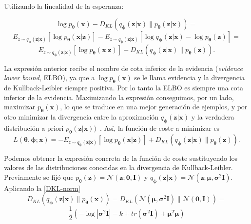 Utilizando la linealidad de la esperanza:

$$ \log p_{\boldsymbol{\theta}}(\textbf{x}) - D_{KL}(q_{\boldsymbol{\phi}}(\textbf{z}|\textbf{x}) \parallel p_{\boldsymbol{\theta}}(\textbf{z}|\textbf{x})) =$$ $$ E_{z \sim q_{\boldsymbol{\phi}} (\textbf{z}|\textbf{x})} \left[ \log p_{\boldsymbol{\theta}}(\textbf{x}|\textbf{z}) \right] - E_{z \sim q_{\boldsymbol{\phi}} (\textbf{z}|\textbf{x})} \left[ \log  q_{\boldsymbol{\phi}}(\textbf{z}|\textbf{x}) - \log p_{\boldsymbol{\theta}}(\textbf{z})\right]=$$ $$ E_{z \sim q_{\boldsymbol{\phi}} (\textbf{z}|\textbf{x})} \left[ \log p_{\boldsymbol{\theta}}(\textbf{x}|\textbf{z}) \right] - D_{KL}(q_{\boldsymbol{\phi}}(\textbf{z}|\textbf{x}) \parallel p_{\boldsymbol{\theta}}(\textbf{z})).$$

La expresión anterior recibe el nombre de cota inferior de la evidencia (\textit{evidence lower bound}, ELBO), ya que a $\log p_{\boldsymbol{\theta}}(\textbf{x})$ se le llama evidencia y la divergencia de Kullback-Leibler siempre positiva. Por lo tanto la ELBO es siempre una cota inferior de la evidencia. Maximizando la expresión conseguimos, por un lado, maximizar $p_{\boldsymbol{\theta}}(\textbf{x})$, lo que se traduce en una mejor generación de ejemplos, y por otro minimizar la divergencia entre la aproximación $q_{\boldsymbol{\phi}}(\textbf{z}|\textbf{x})$ y la verdadera distribución a priori $p_{\boldsymbol{\theta}}(\textbf{z}|\textbf{x}))$~\cite{kingma2019introduction}.  Así, la función de coste a minimizar es $$L(\boldsymbol{\theta}, \boldsymbol{\phi}; \textbf{x}) = - E_{z \sim q_{\boldsymbol{\phi}} (\textbf{z}|\textbf{x})} \left[ \log p_{\boldsymbol{\theta}}(\textbf{x}|\textbf{z}) \right] + D_{KL}(q_{\boldsymbol{\phi}}(\textbf{z}|\textbf{x}) \parallel p_{\boldsymbol{\theta}}(\textbf{z})). $$

Podemos obtener la expresión concreta de la función de coste sustituyendo los valores de las distribuciones conocidas en la divergencia de Kullback-Leibler. Previamente se fijó que $p_{\boldsymbol{\theta}}(\textbf{z}) = \mathcal{N}(\textbf{z};\mathbf{0},\textbf{I})$ y $ q_{\boldsymbol{\phi}}(\textbf{z}|\textbf{x}) = \mathcal{N}(\textbf{z};\boldsymbol{\mu},\boldsymbol{\sigma}^{2}\textbf{I})$. Aplicando la \autoref{DKL-norm} $$ D_{KL}(q_{\boldsymbol{\phi}}(\textbf{z}|\textbf{x}) \parallel p_{\boldsymbol{\theta}}(\textbf{x})) = D_{KL}( \mathcal{N}(\boldsymbol{\mu},\boldsymbol{\sigma}^{2}\textbf{I}) \parallel \mathcal{N}(\mathbf{0},\textbf{I})) =$$ $$\frac{1}{2} \left( -\log|\boldsymbol{\sigma}^{2}\textbf{I}| -k + tr(\boldsymbol{\sigma}^{2}\textbf{I}) + \boldsymbol{\mu}^T\boldsymbol{\mu} \right)$$

